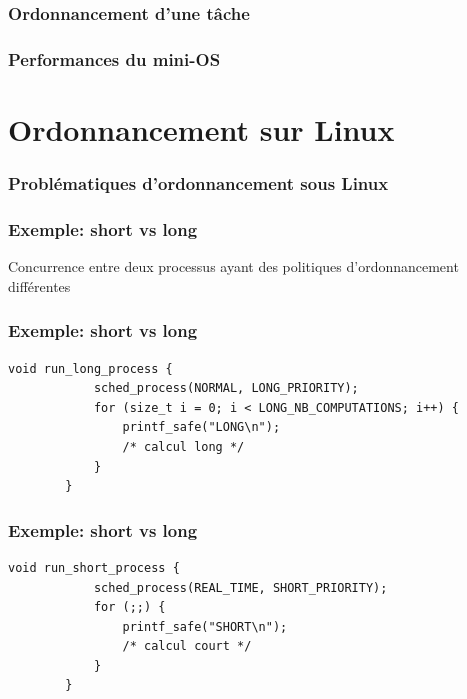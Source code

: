 \documentclass{beamer}
\begin{document}
\begin{frame}
    \frametitle{Ordonnancement d'une tâche}

\end{frame}

\begin{frame}
    \frametitle{Performances du mini-OS}

\end{frame}

\section{Ordonnancement sur Linux}

\begin{frame}
    \frametitle{Problématiques d'ordonnancement sous Linux}

\end{frame}

\begin{frame}
    \frametitle{Exemple: short vs long}

    \begin{center}
        \huge
        Concurrence entre deux processus ayant des politiques d'ordonnancement
        différentes
    \end{center}
\end{frame}

\begin{frame}[fragile]
    \frametitle{Exemple: short vs long}

    \begin{lstlisting}[caption=processus long]
        void run_long_process {
            sched_process(NORMAL, LONG_PRIORITY);
            for (size_t i = 0; i < LONG_NB_COMPUTATIONS; i++) {
                printf_safe("LONG\n");
                /* calcul long */
            }
        }
    \end{lstlisting}
\end{frame}

\begin{frame}[fragile]
    \frametitle{Exemple: short vs long}

    \begin{lstlisting}[caption=processus court]
        void run_short_process {
            sched_process(REAL_TIME, SHORT_PRIORITY);
            for (;;) {
                printf_safe("SHORT\n");
                /* calcul court */
            }
        }
    \end{lstlisting}
\end{frame}
\end{document}
